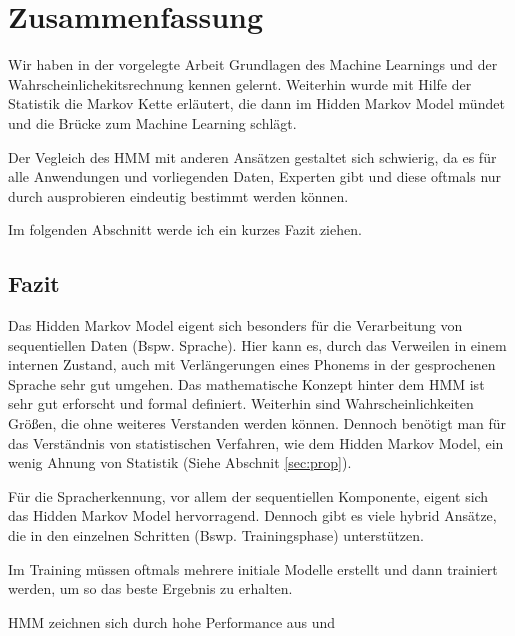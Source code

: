 \chapter{Zusammenfassung}  \label{mainsec:result}
Wir haben in der vorgelegte Arbeit Grundlagen des Machine Learnings und der Wahrscheinlichekitsrechnung kennen gelernt. Weiterhin wurde mit Hilfe der Statistik die Markov Kette erläutert, die dann im Hidden Markov Model mündet und die Brücke zum Machine Learning schlägt. 

Der Vegleich des HMM mit anderen Ansätzen gestaltet sich schwierig, da es für alle Anwendungen und vorliegenden Daten, Experten gibt und diese oftmals nur durch ausprobieren eindeutig bestimmt werden können. 

Im folgenden Abschnitt werde ich ein kurzes Fazit ziehen.


\section{Fazit}
Das Hidden Markov Model eigent sich besonders für die Verarbeitung von sequentiellen Daten (Bspw. Sprache). Hier kann es, durch das Verweilen in einem internen Zustand, auch mit Verlängerungen eines Phonems in der gesprochenen Sprache sehr gut umgehen. Das mathematische Konzept hinter dem HMM ist sehr gut erforscht und formal definiert. Weiterhin sind Wahrscheinlichkeiten Größen, die ohne weiteres Verstanden werden können.
Dennoch benötigt man für das Verständnis von statistischen Verfahren, wie dem Hidden Markov Model, ein wenig Ahnung von Statistik (Siehe Abschnit \ref{sec:prop}).

Für die Spracherkennung, vor allem der sequentiellen Komponente, eigent sich das Hidden Markov Model hervorragend. Dennoch gibt es viele hybrid Ansätze, die in den einzelnen Schritten (Bswp. Trainingsphase) unterstützen.

Im Training müssen oftmals mehrere initiale Modelle erstellt und dann trainiert werden, um so das beste Ergebnis zu erhalten.   

HMM zeichnen sich durch hohe Performance aus und 
